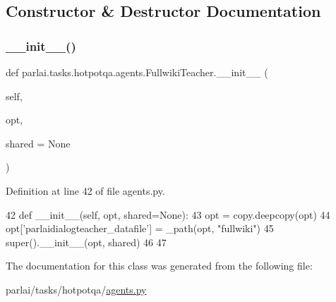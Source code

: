 \subsection{Constructor \& Destructor Documentation}
\mbox{\label{classparlai_1_1tasks_1_1hotpotqa_1_1agents_1_1FullwikiTeacher_a7e12fc08024330f828800caee978f7d7}} 
\subsubsection{\texorpdfstring{\+\_\+\+\_\+init\+\_\+\+\_\+()}{\_\_init\_\_()}}
{\footnotesize\ttfamily def parlai.\+tasks.\+hotpotqa.\+agents.\+Fullwiki\+Teacher.\+\_\+\+\_\+init\+\_\+\+\_\+ (\begin{DoxyParamCaption}\item[{}]{self,  }\item[{}]{opt,  }\item[{}]{shared = {\ttfamily None} }\end{DoxyParamCaption})}



Definition at line 42 of file agents.\+py.


\begin{DoxyCode}
42     \textcolor{keyword}{def }\_\_init\_\_(self, opt, shared=None):
43         opt = copy.deepcopy(opt)
44         opt[\textcolor{stringliteral}{'parlaidialogteacher\_datafile'}] = \_path(opt, \textcolor{stringliteral}{"fullwiki"})
45         super().\_\_init\_\_(opt, shared)
46 
47 
\end{DoxyCode}


The documentation for this class was generated from the following file\+:\begin{DoxyCompactItemize}
\item 
parlai/tasks/hotpotqa/\hyperlink{parlai_2tasks_2hotpotqa_2agents_8py}{agents.\+py}\end{DoxyCompactItemize}
